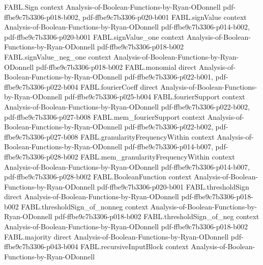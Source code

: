 \begin{theorem}
\label{FABL.majority_symmetric}
\leanok
{}
\proofstep
  {FABL.Sign}
  {context}
  {Analysis-of-Boolean-Functions-by-Ryan-ODonnell}
  {pdf-ffbe9c7b3306-p018-b002,
    pdf-ffbe9c7b3306-p020-b001}
\proofstep
  {FABL.signValue}
  {context}
  {Analysis-of-Boolean-Functions-by-Ryan-ODonnell}
  {pdf-ffbe9c7b3306-p014-b002,
    pdf-ffbe9c7b3306-p020-b001}
\proofstep
  {FABL.signValue_one}
  {context}
  {Analysis-of-Boolean-Functions-by-Ryan-ODonnell}
  {pdf-ffbe9c7b3306-p018-b002}
\proofstep
  {FABL.signValue_neg_one}
  {context}
  {Analysis-of-Boolean-Functions-by-Ryan-ODonnell}
  {pdf-ffbe9c7b3306-p018-b002}
\proofstep
  {FABL.monomial}
  {direct}
  {Analysis-of-Boolean-Functions-by-Ryan-ODonnell}
  {pdf-ffbe9c7b3306-p022-b001,
    pdf-ffbe9c7b3306-p022-b004}
\proofstep
  {FABL.fourierCoeff}
  {direct}
  {Analysis-of-Boolean-Functions-by-Ryan-ODonnell}
  {pdf-ffbe9c7b3306-p025-b004}
\proofstep
  {FABL.fourierSupport}
  {context}
  {Analysis-of-Boolean-Functions-by-Ryan-ODonnell}
  {pdf-ffbe9c7b3306-p022-b002,
    pdf-ffbe9c7b3306-p027-b008}
\proofstep
  {FABL.mem_fourierSupport}
  {context}
  {Analysis-of-Boolean-Functions-by-Ryan-ODonnell}
  {pdf-ffbe9c7b3306-p022-b002,
    pdf-ffbe9c7b3306-p027-b008}
\proofstep
  {FABL.granularityFrequencyWithin}
  {context}
  {Analysis-of-Boolean-Functions-by-Ryan-ODonnell}
  {pdf-ffbe9c7b3306-p014-b007,
    pdf-ffbe9c7b3306-p028-b002}
\proofstep
  {FABL.mem_granularityFrequencyWithin}
  {context}
  {Analysis-of-Boolean-Functions-by-Ryan-ODonnell}
  {pdf-ffbe9c7b3306-p014-b007,
    pdf-ffbe9c7b3306-p028-b002}
\proofstep
  {FABL.BooleanFunction}
  {context}
  {Analysis-of-Boolean-Functions-by-Ryan-ODonnell}
  {pdf-ffbe9c7b3306-p020-b001}
\proofstep
  {FABL.thresholdSign}
  {direct}
  {Analysis-of-Boolean-Functions-by-Ryan-ODonnell}
  {pdf-ffbe9c7b3306-p018-b002}
\proofstep
  {FABL.thresholdSign_of_nonneg}
  {context}
  {Analysis-of-Boolean-Functions-by-Ryan-ODonnell}
  {pdf-ffbe9c7b3306-p018-b002}
\proofstep
  {FABL.thresholdSign_of_neg}
  {context}
  {Analysis-of-Boolean-Functions-by-Ryan-ODonnell}
  {pdf-ffbe9c7b3306-p018-b002}
\proofstep
  {FABL.majority}
  {direct}
  {Analysis-of-Boolean-Functions-by-Ryan-ODonnell}
  {pdf-ffbe9c7b3306-p043-b004}
\proofstep
  {FABL.recursiveInputBlock}
  {context}
  {Analysis-of-Boolean-Functions-by-Ryan-ODonnell}

\end{theorem}
